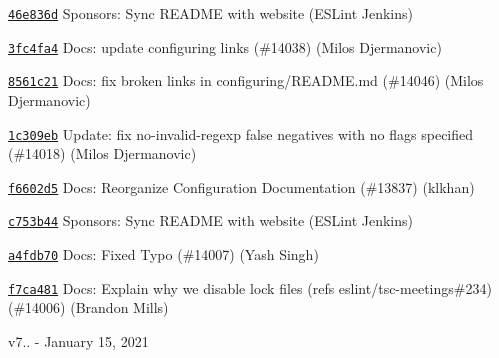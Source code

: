 \begin{DoxyItemize}
\item \href{https://github.com/eslint/eslint/commit/46e836d46442d2ec756038a2e12ba19b74394dbd}{\texttt{ {\ttfamily 46e836d}}} Sponsors\+: Sync README with website (ESLint Jenkins)
\item \href{https://github.com/eslint/eslint/commit/3fc4fa485ca9ccd5e16dbc7e53ba31452d22dc4a}{\texttt{ {\ttfamily 3fc4fa4}}} Docs\+: update configuring links (\#14038) (Milos Djermanovic)
\item \href{https://github.com/eslint/eslint/commit/8561c2116ef89e53ebffb750066f1b00a4acdb76}{\texttt{ {\ttfamily 8561c21}}} Docs\+: fix broken links in configuring/\+README.\+md (\#14046) (Milos Djermanovic)
\item \href{https://github.com/eslint/eslint/commit/1c309ebca4a81a0faf397103dbc621019dea8c9c}{\texttt{ {\ttfamily 1c309eb}}} Update\+: fix no-\/invalid-\/regexp false negatives with no flags specified (\#14018) (Milos Djermanovic)
\item \href{https://github.com/eslint/eslint/commit/f6602d569427e9e2a4f3b5ca3fc3a8bffb28d15e}{\texttt{ {\ttfamily f6602d5}}} Docs\+: Reorganize Configuration Documentation (\#13837) (klkhan)
\item \href{https://github.com/eslint/eslint/commit/c753b442ef67867a178ffc2ad29b4e0534f72469}{\texttt{ {\ttfamily c753b44}}} Sponsors\+: Sync README with website (ESLint Jenkins)
\item \href{https://github.com/eslint/eslint/commit/a4fdb7001aa41b9ad8bb92cc8a47b9135c94afc7}{\texttt{ {\ttfamily a4fdb70}}} Docs\+: Fixed Typo (\#14007) (Yash Singh)
\item \href{https://github.com/eslint/eslint/commit/f7ca48165d025e01c38698352cff24d1de87cc8b}{\texttt{ {\ttfamily f7ca481}}} Docs\+: Explain why we disable lock files (refs eslint/tsc-\/meetings\#234) (\#14006) (Brandon Mills)
\end{DoxyItemize}

v7.. -\/ January 15, 2021


